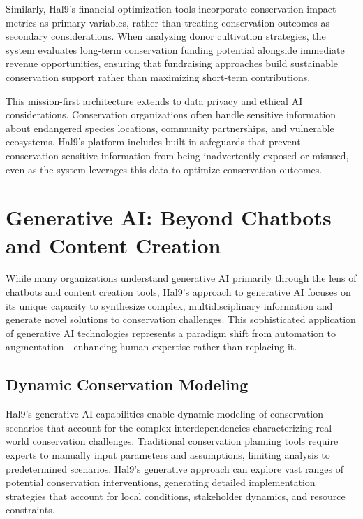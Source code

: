\documentclass[
  Letterpaper,
]{scrbook}
\begin{document}
Similarly, Hal9's financial optimization tools incorporate conservation
impact metrics as primary variables, rather than treating conservation
outcomes as secondary considerations. When analyzing donor cultivation
strategies, the system evaluates long-term conservation funding
potential alongside immediate revenue opportunities, ensuring that
fundraising approaches build sustainable conservation support rather
than maximizing short-term contributions.

This mission-first architecture extends to data privacy and ethical AI
considerations. Conservation organizations often handle sensitive
information about endangered species locations, community partnerships,
and vulnerable ecosystems. Hal9's platform includes built-in safeguards
that prevent conservation-sensitive information from being inadvertently
exposed or misused, even as the system leverages this data to optimize
conservation outcomes.

\section{Generative AI: Beyond Chatbots and Content
Creation}\label{generative-ai-beyond-chatbots-and-content-creation}

While many organizations understand generative AI primarily through the
lens of chatbots and content creation tools, Hal9's approach to
generative AI focuses on its unique capacity to synthesize complex,
multidisciplinary information and generate novel solutions to
conservation challenges. This sophisticated application of generative AI
technologies represents a paradigm shift from automation to
augmentation---enhancing human expertise rather than replacing it.

\subsection{Dynamic Conservation
Modeling}\label{dynamic-conservation-modeling}

Hal9's generative AI capabilities enable dynamic modeling of
conservation scenarios that account for the complex interdependencies
characterizing real-world conservation challenges. Traditional
conservation planning tools require experts to manually input parameters
and assumptions, limiting analysis to predetermined scenarios. Hal9's
generative approach can explore vast ranges of potential conservation
interventions, generating detailed implementation strategies that
account for local conditions, stakeholder dynamics, and resource
constraints.
\end{document}
